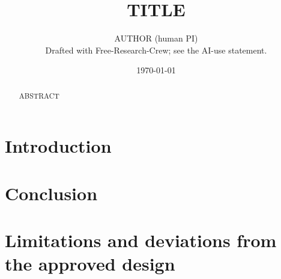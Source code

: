 \documentclass[11pt]{article}
\title{TITLE}
\author{AUTHOR (human PI) \\ \small Drafted with Free-Research-Crew; see the AI-use statement.}
\date{\today}
\begin{document}
\maketitle

\begin{abstract}
ABSTRACT
\end{abstract}

\section{Introduction}

\section{Conclusion}

\section*{Limitations and deviations from the approved design}





\end{document}
